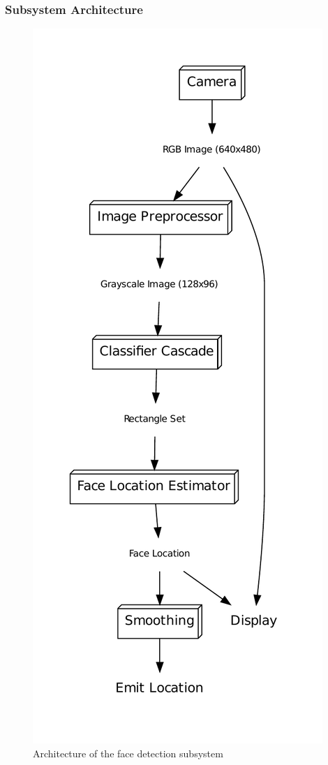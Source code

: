 \documentclass[letterpaper]{article}
\begin{document}
\subsubsection{Subsystem Architecture}
\begin{figure}[hp]
  \centering
  \includegraphics[scale=0.6]{figures/facearch}
  \caption{Architecture of the face detection subsystem}
  \label{fig:facearch}
\end{figure}
\end{document}
